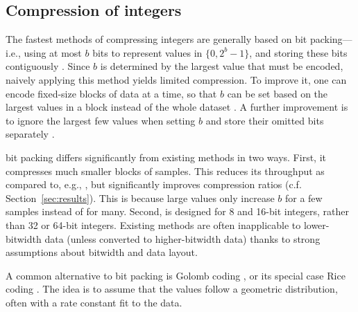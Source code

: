 

\subsection{Compression of integers}


The fastest methods of compressing integers are generally based on bit packing---i.e., using at most $b$ bits to represent values in $\{0, 2^b-1\}$, and storing these bits contiguously \cite{bbp, pfor, fastpfor}. Since $b$ is determined by the largest value that must be encoded, naively applying this method yields limited compression. To improve it, one can encode fixed-size blocks of data at a time, so that $b$ can be set based on the largest values in a block instead of the whole dataset \cite{kGamma, pfor, fastpfor}. A further improvement is to ignore the largest few values when setting $b$ and store their omitted bits separately \cite{pfor, fastpfor}.

\minesp bit packing differs significantly from existing methods in two ways. First, it compresses much smaller blocks of samples. This reduces its throughput as compared to, e.g., \cite{fastpfor}, but significantly improves compression ratios (c.f. Section~\ref{sec:results}). This is because large values only increase $b$ for a few samples instead of for many. Second, \minesp is designed for 8 and 16-bit integers, rather than 32 or 64-bit integers. Existing methods are often inapplicable to lower-bitwidth data (unless converted to higher-bitwidth data) thanks to strong assumptions about bitwidth and data layout.

A common \cite{flac, shorten} alternative to bit packing is Golomb coding \cite{golomb}, or its special case Rice coding \cite{rice}. The idea is to assume that the values follow a geometric distribution, often with a rate constant fit to the data. %

